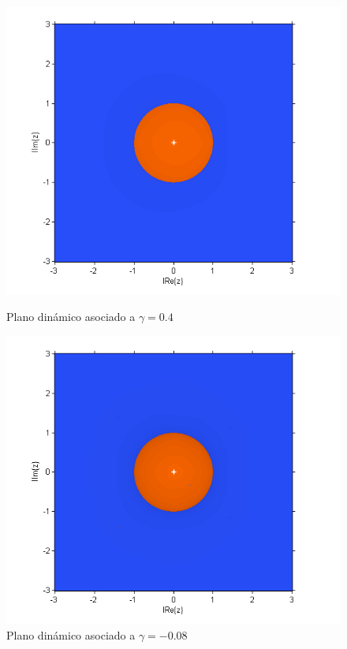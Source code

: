 \begin{figure}[h!!!]
	\begin{minipage}[m]{0.5\linewidth}%
		\centering \includegraphics[width=\linewidth]{redpoint1.png}
		\caption{Plano dinámico asociado a $\gamma=0.4$}\label{estable1}
	\end{minipage}
	\begin{minipage}[m]{0.5\linewidth}%
		\centering \includegraphics[width=\linewidth]{redpoint2.png}
		\caption{Plano dinámico asociado a $\gamma=-0.08$}\label{estable2}
	\end{minipage}
\end{figure}

